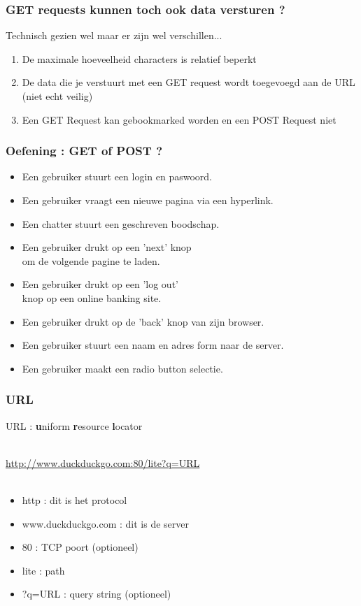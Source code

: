 \documentclass{beamer}
\begin{document}
\begin{frame}

\frametitle{GET requests kunnen toch ook data versturen ?}

{\Large Technisch gezien wel maar er zijn wel verschillen...

\begin{enumerate}
  \item De maximale hoeveelheid characters is relatief beperkt
  \item De data die je verstuurt met een GET request wordt toegevoegd aan de URL (niet echt veilig)
  \item Een GET Request kan gebookmarked worden en een POST Request niet
\end{enumerate}}

\end{frame}


\begin{frame}

\frametitle{Oefening : GET of POST ?}

{\large \begin{itemize}
\item Een gebruiker stuurt een login en paswoord.
\item Een gebruiker vraagt een nieuwe pagina via een hyperlink.
\item Een chatter stuurt een geschreven boodschap.
\item Een gebruiker drukt op een 'next' knop \\om de volgende pagine te laden.
\item Een gebruiker drukt op een 'log out' \\knop op een online banking site.
\item Een gebruiker drukt op de 'back' knop van zijn browser.
\item Een gebruiker stuurt een naam en adres form naar de server.
\item Een gebruiker maakt een radio button selectie.
\end{itemize}}

\end{frame}


\begin{frame}

\frametitle{URL}

{\LARGE URL : \textbf{u}niform \textbf{r}esource \textbf{l}ocator\\~\\}

{\Large \url{http://www.duckduckgo.com:80/lite?q=URL}}\\~\\

\begin{itemize}
  \item http : dit is het protocol
  \item www.duckduckgo.com : dit is de server
  \item 80 : TCP poort (optioneel)
  \item lite : path
  \item ?q=URL : query string (optioneel)
\end{itemize}

\end{frame}
\end{document}
